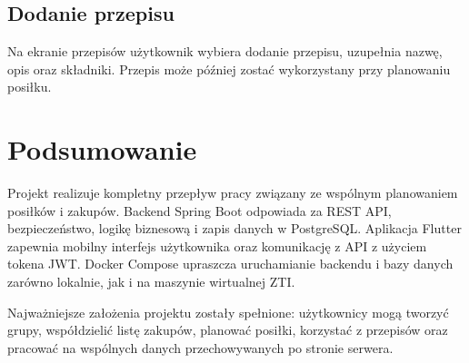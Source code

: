 \documentclass[12pt,a4paper]{article}
\begin{document}
\subsection{Dodanie przepisu}

Na ekranie przepisów użytkownik wybiera dodanie przepisu, uzupełnia nazwę, opis oraz składniki. Przepis może później zostać wykorzystany przy planowaniu posiłku.

\section{Podsumowanie}

Projekt realizuje kompletny przepływ pracy związany ze wspólnym planowaniem posiłków i zakupów. Backend Spring Boot odpowiada za REST API, bezpieczeństwo, logikę biznesową i zapis danych w PostgreSQL. Aplikacja Flutter zapewnia mobilny interfejs użytkownika oraz komunikację z API z użyciem tokena JWT. Docker Compose upraszcza uruchamianie backendu i bazy danych zarówno lokalnie, jak i na maszynie wirtualnej ZTI.

Najważniejsze założenia projektu zostały spełnione: użytkownicy mogą tworzyć grupy, współdzielić listę zakupów, planować posiłki, korzystać z przepisów oraz pracować na wspólnych danych przechowywanych po stronie serwera.
\end{document}
